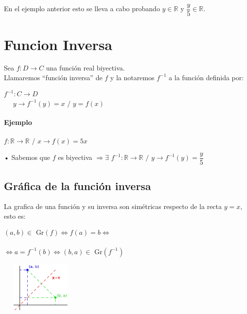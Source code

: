 En el ejemplo anterior esto se lleva a cabo probando $y \in \mathbb{R}$ y $\dfrac{y}{5} \in \mathbb{R}$.
\section{Funcion Inversa}

Sea $f: D \longrightarrow C$ una función real biyectiva.\\

\quad Llamaremos ``función  inversa'' de $f$ y la notaremos $f^{-1}$ a la función definida por:
\begin{center}
$f^{-1}: C \longrightarrow D $\\
$ $ \qquad $ $ \qquad $ $ \qquad $ $ \qquad $ y \longrightarrow f^{-1}(y) = x$ $/$ $ y=f(x)$\\
\end{center}

\paragraph{Ejemplo}

\qquad $f: \mathbb{R} \longrightarrow \mathbb{R}$ $/$ $x \longrightarrow f(x)= 5x$

\qquad • Sabemos que $f$ es biyectiva $\Rightarrow \exists$ $f^{-1} : \mathbb{R} \longrightarrow \mathbb{R}$ $/$ $y \longrightarrow f^{-1}(y)= \dfrac{y}{5}$
\subsection{Gráfica de la función inversa}

La grafica de una función y su inversa son simétricas respecto de la recta $y=x$, esto es:\\

\hfill
\begin{minipage}{.45\textwidth}
\begin{center}
$(a, b) \in $ Gr$(f) \Leftrightarrow f(a)=b \Leftrightarrow $\\
\qquad\\
$\Leftrightarrow a=f^{-1}(b) \Leftrightarrow (b, a) \in $ Gr$(f^{-1})$
\end{center}
\end{minipage}
\hfill
\begin{minipage}{.45\textwidth}
\begin{center}
\includegraphics[height=2.5cm,width=4cm]{grffi.eps} \\
\end{center}
\end{minipage}
\hfill

